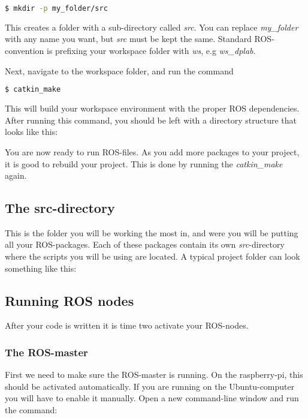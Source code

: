 \begin{lstlisting}[language=bash,]
$ mkdir -p my_folder/src
\end{lstlisting}

This creates a folder with a sub-directory called \textit{src}. You can replace \textit{my\_folder} with any name you want, but \textit{src} must be kept the same. Standard ROS-convention is prefixing your workspace folder with \textit{ws}, e.g \textit{ws\_dplab}.

Next, navigate to the workspace folder, and run the command

\begin{lstlisting}[language=bash]
$ catkin_make
\end{lstlisting}

This will build your workspace environment with the proper ROS dependencies. After running this command, you should be left with a directory structure that looks like this: 


You are now ready to run ROS-files. As you add more packages to your project, it is good to rebuild your project. This is done by running the \textit{catkin\_make} again.

\subsection{The src-directory}
\label{sec:src}
This is the folder you will be working the most in, and were you will be putting all your ROS-packages. Each of these packages contain its own \textit{src}-directory where the scripts you will be using are located. A typical project folder can look something like this: 


\subsection{Running ROS nodes}
\label{sec:run-nodes}
After your code is written it is time two activate your ROS-nodes.

\subsubsection{The ROS-master}

First we need to make sure the ROS-master is running. On the raspberry-pi, this should be activated automatically. If you are running on the Ubuntu-computer you will have to enable it manually. Open a new command-line window and run the command: 

